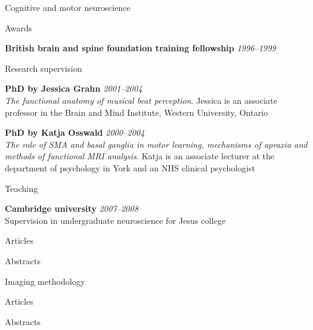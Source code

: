 \documentclass{cv}
\newcommand{\PlaceDateNote}[3]{{\bf #1} \hfill {\em #2} \\#3}
\begin{document}
\begin{cvSection}{Cognitive and motor neuroscience}

\begin{cvSubSection}{Awards}

{\bf British brain and spine foundation training fellowship} \hfill {\em
1996--1999}

\end{cvSubSection}

\begin{cvSubSection}{Research supervision}

\PlaceDateNote{PhD by Jessica Grahn}{2001--2004}{
{\em The functional anatomy of musical beat perception}. Jessica is an
associate professor in the Brain and Mind Institute, Western University,
Ontario}

\PlaceDateNote{PhD by Katja Osswald}{2000--2004}{
{\em The role of SMA and basal ganglia in motor learning, mechanisms of
apraxia and methods of functional MRI analysis}. Katja is an associate
lecturer at the department of psychology in York and an NHS clinical
psychologist}

\end{cvSubSection}

\begin{cvSubSection}{Teaching}

\PlaceDateNote{Cambridge university}{2007--2008}{
Supervision in undergraduate neuroscience for Jesus college}

\end{cvSubSection}

\begin{cvSubSection}{Articles}

\printbibliography[heading=none,
    keyword=movethink,
    keyword=article,
notkeyword=omit]

\end{cvSubSection}

\begin{cvSubSection}{Abstracts}

\printbibliography[heading=none,
    keyword=movethink,
    keyword=abstract,
notkeyword=omit]

\end{cvSubSection}

\end{cvSection}

\begin{cvSection}{Imaging methodology}

\begin{cvSubSection}{Articles}

\printbibliography[heading=none,
    keyword=methods,
    keyword=article,
notkeyword=omit]

\end{cvSubSection}

\begin{cvSubSection}{Abstracts}

\printbibliography[heading=none,
    keyword=methods,
    keyword=abstract,
notkeyword=omit]

\end{cvSubSection}

\end{cvSection}
\end{document}
